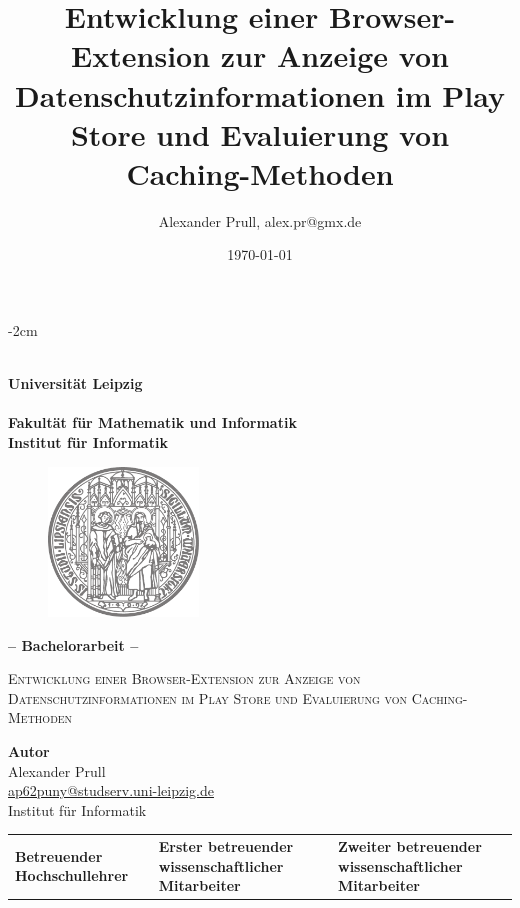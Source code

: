 \documentclass[11pt, a4paper, twoside, openright, final]{book}
\author{Alexander Prull, alex.pr@gmx.de}
\title{Entwicklung einer Browser-Extension zur Anzeige von Datenschutzinformationen im Play Store und Evaluierung von Caching-Methoden}
\date{\today} %
\numberwithin{equation}{chapter}		%
\newcommand{\1}{\mathbbm{1}}
\begin{document}

\begin{titlepage}
	\begin{adjustwidth*}{}{-2cm}
		\begin{center}
			~\\		%
			\textbf{\Huge \sffamily	Universität Leipzig	\\	\small ~					\\
					\large \sffamily	Fakultät für Mathematik und Informatik	 \\
										Institut für Informatik				\\}
			
			\vspace{0.3cm}
			\begin{figure}[H]
	        	\hspace{5.1cm}
	       		\includegraphics[width=4cm]{siegel.png}
	        \end{figure}
	        \vspace{0.15cm}
			\textbf{\Large \sffamily -- Bachelorarbeit --}
			\vspace{0.5cm}
			
			 \textsc{ \LARGE
			Entwicklung einer Browser-Extension zur Anzeige von Datenschutzinformationen im Play Store und Evaluierung von Caching-Methoden}
			
			\vspace{1.0cm}
			\textbf{Autor} \\
		Alexander Prull \\ 
		\href{mailto:ap62puny@studserv.uni-leipzig.de}{ap62puny@studserv.uni-leipzig.de} \\
		Institut für Informatik \\
		\end{center}
		
		\vfill
		
		\begin{tabular}{*{3}{C{4.5cm}}}
			\small \textbf{Betreuender Hochschullehrer} & 
			\small \textbf{Erster betreuender wissenschaftlicher Mitarbeiter} & 
			\small \textbf{Zweiter betreuender wissenschaftlicher Mitarbeiter} \\
			

\end{tabular}
\end{adjustwidth*}
\end{titlepage}
\end{document}
